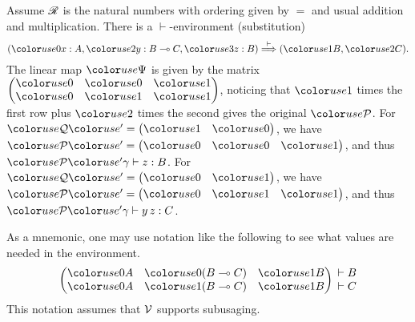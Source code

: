 \begin{example}
  Assume $\mathscr R$ is the natural numbers with ordering given by $=$ and usual
  addition and multiplication.
  There is a $\vdash$-environment (substitution)
  \[
    \plr{\gr0x : A, \gr2y : B \multimap C, \gr3z : B} \env\vdash
    \plr{\gr1B, \gr2C}.
  \]
  The linear map $\gr\Psi$ is given by the matrix
  \(
    \begin{pmatrix}
      \gr0 & \gr0 & \gr1 \\
      \gr0 & \gr1 & \gr1
    \end{pmatrix}
  \),
  noticing that $\gr1$ times the first row plus $\gr2$ times the second gives
  the original $\grP$.
  For $\grQprime = \begin{pmatrix} \gr1 & \gr0 \end{pmatrix}$, we have
  $\grPprime = \begin{pmatrix} \gr0 & \gr0 & \gr1 \end{pmatrix}$, and thus
  $\grPprime\gamma \vdash z : B$.
  For $\grQprime = \begin{pmatrix} \gr0 & \gr1 \end{pmatrix}$, we have
  $\grPprime = \begin{pmatrix} \gr0 & \gr1 & \gr1 \end{pmatrix}$, and thus
  $\grPprime\gamma \vdash y\,z : C$.
\end{example}

As a mnemonic, one may use notation like the following to see what values are
needed in the environment.
\[
  \begin{pmatrix}
    \gr0A & \gr0\plr{B \multimap C} & \gr1B \\
    \gr0A & \gr1\plr{B \multimap C} & \gr1B
  \end{pmatrix}
  \begin{matrix}
    {} \vdash B \\
    {} \vdash C
  \end{matrix}
\]
This notation assumes that $\mathcal V$ supports subusaging.


